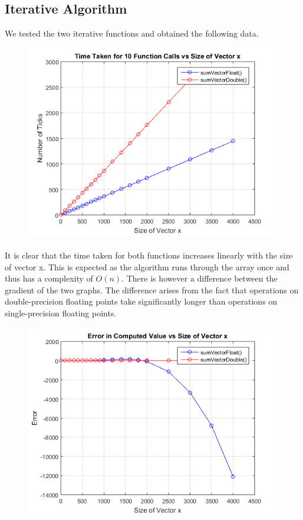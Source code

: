 \documentclass{article}
\begin{document}
\subsection{Iterative Algorithm}
We tested the two iterative functions and obtained the following data.
\begin{figure}[h]
    \centering
    \includegraphics[scale=0.6]{EfficiencyOfFunctions}
\end{figure}
\paragraph{}
It is clear that the time taken for both functions increases linearly with the size of vector x. This is expected as the algorithm runs through the array once and thus has a complexity of $O(n)$. There is however a difference between the gradient of the two graphs. The difference arises from the fact that operations on double-precision floating points take significantly longer than operations on single-precision floating points.
\begin{figure}[h]
    \centering
    \includegraphics[scale=0.6]{ErrorOfFunctions}
\end{figure}
\end{document}
